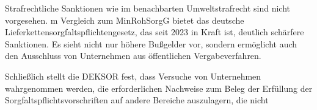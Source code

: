 \documentclass[12pt,a4paper,oneside]{book} %
\begin{document}
	
	Strafrechtliche Sanktionen wie im benachbarten Umweltstrafrecht sind nicht vorgesehen. m Vergleich zum MinRohSorgG bietet das deutsche Lieferkettensorgfaltspflichtengesetz, das seit 2023 in Kraft ist, deutlich schärfere Sanktionen. Es sieht nicht nur höhere Bußgelder vor, sondern ermöglicht auch den Ausschluss von Unternehmen aus öffentlichen Vergabeverfahren. 
	
	Schließlich stellt die DEKSOR fest, dass Versuche von Unternehmen wahrgenommen werden, die erforderlichen Nachweise zum Beleg der Erfüllung der Sorgfaltspflichtsvorschriften auf andere Bereiche auszulagern, die nicht 
	
	
	
	
\end{document}
